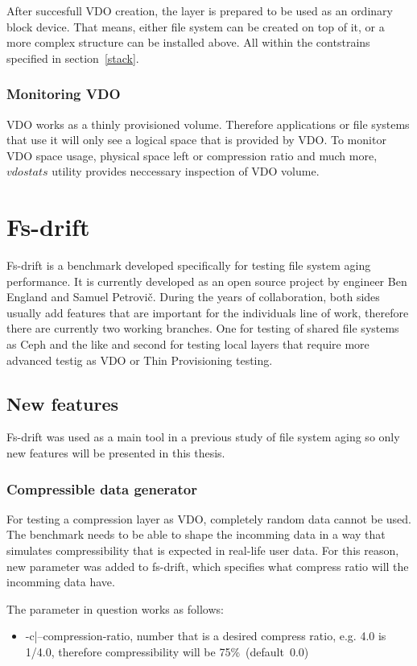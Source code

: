 \documentclass[
  color, %
  table, %
  lof,   %
  lot,   %
]{fithesis3}
\begin{document}
After succesfull VDO creation, the layer is prepared to be used as an ordinary block device. That means, either file system can be created on top of it, or a more complex structure can be installed above. All within the contstrains specified in section~\ref{stack}.

\subsection{Monitoring VDO}
VDO works as a thinly provisioned volume. Therefore applications or file systems that use it will only see a logical space that is provided by VDO. To monitor VDO space usage, physical space left or compression ratio and much more, $vdostats$ utility provides neccessary inspection of VDO volume.

\chapter{Fs-drift}
Fs-drift is a benchmark developed specifically for testing file system aging performance. It is currently developed as an open source project by engineer Ben England and Samuel Petrovič. During the years of collaboration, both sides usually add features that are important for the individuals line of work, therefore there are currently two working branches. One for testing of shared file systems as Ceph and the like and second for testing local layers that require more advanced testig as VDO or Thin Provisioning testing. 

\section{New features}
Fs-drift was used as a main tool in a previous study of file system aging so only new features will be presented in this thesis.

\subsection{Compressible data generator}
For testing a compression layer as VDO, completely random data cannot be used. The benchmark needs to be able to shape the incomming data in a way that simulates compressibility that is expected in real-life user data. For this reason, new parameter was added to fs-drift, which specifies what compress ratio will the incomming data have.

The parameter in question works as follows:
\begin{itemize}
    \item -c|--compression-ratio, number that is a desired compress ratio, e.g. 4.0 is 1/4.0, therefore compressibility will be 75\%~(default~0.0)
\end{itemize}
\end{document}

